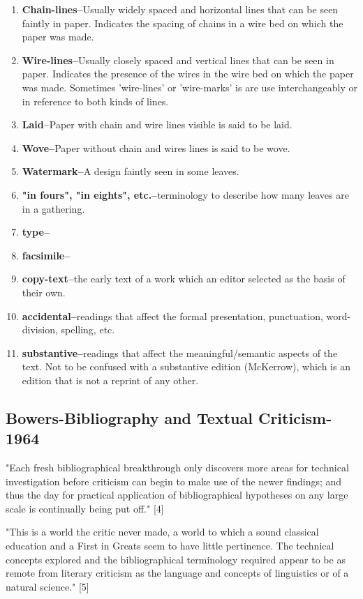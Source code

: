 \documentclass[course, english]{Notes}
\begin{document}
\begin{enumerate}
\item \textbf{Chain-lines--}Usually widely spaced and horizontal lines that can be seen faintly in paper. Indicates the spacing of chains in a wire bed on which the paper was made.
\item \textbf{Wire-lines--}Usually closely spaced and vertical lines that can be seen in paper. Indicates the presence of the wires in the wire bed on which the paper was made. Sometimes 'wire-lines' or 'wire-marks' is are use interchangeably or in reference to both kinds of lines. 
\item \textbf{Laid--}Paper with chain and wire lines visible is said to be laid.
\item \textbf{Wove--}Paper without chain and wires lines is said to be wove. 
\item \textbf{Watermark--}A design faintly seen in some leaves.
\item \textbf{"in fours", "in eights", etc.--}terminology to describe how many leaves are in a gathering. 
\item \textbf{type--}
\item \textbf{facsimile--}
\item \textbf{copy-text--}the early text of a work which an editor selected as the basis of their own.
\item \textbf{accidental--}readings that affect the formal presentation, punctuation, word-division, spelling, etc.
\item \textbf{substantive--}readings that affect the meaningful/semantic aspects of the text. Not to be confused with a substantive edition (McKerrow), which is an edition that is not a reprint of any other. 

\end{enumerate}

\subsection{Bowers-Bibliography and Textual Criticism-1964}

"Each fresh bibliographical breakthrough only discovers more areas for technical investigation before criticism can begin to make use of the newer findings; and thus the day for practical application of bibliographical hypotheses on any large scale is continually being put off." [4]

"This is a world the critic never made, a world to which a sound classical education and a First in Greats seem to have little pertinence. The technical concepts explored and the bibliographical terminology required appear to be as remote from literary criticism as the language and concepts of linguistics or of a natural science." [5]
\end{document}
